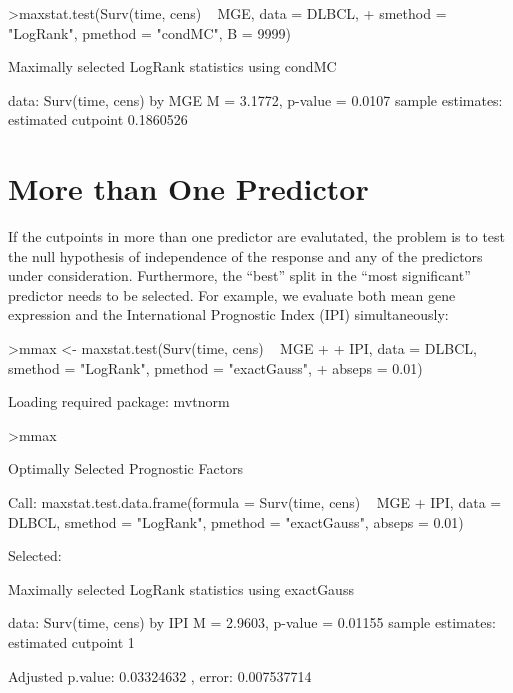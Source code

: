 \documentclass{article}
\renewcommand{\baselinestretch}{1.5}
\begin{document}
\begin{Schunk}
\begin{Sinput}
>maxstat.test(Surv(time, cens) ~ MGE, data = DLBCL, 
+     smethod = "LogRank", pmethod = "condMC", B = 9999)
\end{Sinput}
\begin{Soutput}
	Maximally selected LogRank statistics using condMC

data:  Surv(time, cens) by MGE 
M = 3.1772, p-value = 0.0107
sample estimates:
estimated cutpoint 
         0.1860526 
\end{Soutput}
\end{Schunk}



\section{More than One Predictor}

If the cutpoints in more than one predictor are evalutated, the problem is
to test the null hypothesis of independence of the response and any of the
predictors under consideration. Furthermore, the ``best'' split in the
``most significant'' predictor needs to be selected. For example, we
evaluate both mean gene expression and the International Prognostic Index
(IPI) simultaneously:

\renewcommand{\baselinestretch}{1}
\begin{Schunk}
\begin{Sinput}
>mmax <- maxstat.test(Surv(time, cens) ~ MGE + 
+     IPI, data = DLBCL, smethod = "LogRank", pmethod = "exactGauss", 
+     abseps = 0.01)
\end{Sinput}
\begin{Soutput}
Loading required package: mvtnorm 
\end{Soutput}
\begin{Sinput}
>mmax
\end{Sinput}
\begin{Soutput}
	 Optimally Selected Prognostic Factors 

Call: maxstat.test.data.frame(formula = Surv(time, cens) ~ MGE + IPI, 
    data = DLBCL, smethod = "LogRank", pmethod = "exactGauss", 
    abseps = 0.01)


 Selected: 

	Maximally selected LogRank statistics using
	exactGauss

data:  Surv(time, cens) by IPI 
M = 2.9603, p-value = 0.01155
sample estimates:
estimated cutpoint 
                 1 

Adjusted p.value: 
0.03324632 , error:  0.007537714 
\end{Soutput}
\end{Schunk}
\renewcommand{\baselinestretch}{1.5}
\end{document}
